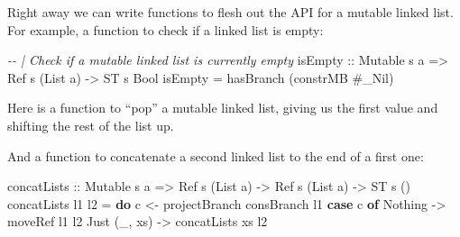 \documentclass[]{article}
\newenvironment{Shaded}{}{}
\newcommand{\CommentTok}[1]{\textcolor[rgb]{0.38,0.63,0.69}{\textit{#1}}}
\newcommand{\DataTypeTok}[1]{\textcolor[rgb]{0.56,0.13,0.00}{#1}}
\newcommand{\FunctionTok}[1]{\textcolor[rgb]{0.02,0.16,0.49}{#1}}
\newcommand{\KeywordTok}[1]{\textcolor[rgb]{0.00,0.44,0.13}{\textbf{#1}}}
\newcommand{\NormalTok}[1]{#1}
\newcommand{\OperatorTok}[1]{\textcolor[rgb]{0.40,0.40,0.40}{#1}}
\newcommand{\OtherTok}[1]{\textcolor[rgb]{0.00,0.44,0.13}{#1}}
\begin{document}
Right away we can write functions to flesh out the API for a mutable linked
list. For example, a function to check if a linked list is empty:

\begin{Shaded}
\begin{Highlighting}[]
\CommentTok{{-}{-} | Check if a mutable linked list is currently empty}
\NormalTok{isEmpty}
\OtherTok{    ::} \DataTypeTok{Mutable}\NormalTok{ s a}
    \OtherTok{=\textgreater{}} \DataTypeTok{Ref}\NormalTok{ s (}\DataTypeTok{List}\NormalTok{ a)}
    \OtherTok{{-}\textgreater{}} \DataTypeTok{ST}\NormalTok{ s }\DataTypeTok{Bool}
\NormalTok{isEmpty }\OtherTok{=}\NormalTok{ hasBranch (constrMB }\OperatorTok{\#}\NormalTok{\_Nil)}
\end{Highlighting}
\end{Shaded}

Here is a function to ``pop'' a mutable linked list, giving us the first value
and shifting the rest of the list up.

\begin{Shaded}
\end{Shaded}

And a function to concatenate a second linked list to the end of a first one:

\begin{Shaded}
\begin{Highlighting}[]
\NormalTok{concatLists}
\OtherTok{    ::} \DataTypeTok{Mutable}\NormalTok{ s a}
    \OtherTok{=\textgreater{}} \DataTypeTok{Ref}\NormalTok{ s (}\DataTypeTok{List}\NormalTok{ a)}
    \OtherTok{{-}\textgreater{}} \DataTypeTok{Ref}\NormalTok{ s (}\DataTypeTok{List}\NormalTok{ a)}
    \OtherTok{{-}\textgreater{}} \DataTypeTok{ST}\NormalTok{ s ()}
\NormalTok{concatLists l1 l2 }\OtherTok{=} \KeywordTok{do}
\NormalTok{    c }\OtherTok{\textless{}{-}}\NormalTok{ projectBranch consBranch l1}
    \KeywordTok{case}\NormalTok{ c }\KeywordTok{of}
      \DataTypeTok{Nothing}      \OtherTok{{-}\textgreater{}}\NormalTok{ moveRef l1 l2}
      \DataTypeTok{Just}\NormalTok{ (\_, xs) }\OtherTok{{-}\textgreater{}}\NormalTok{ concatLists xs l2}
\end{Highlighting}
\end{Shaded}
\end{document}
